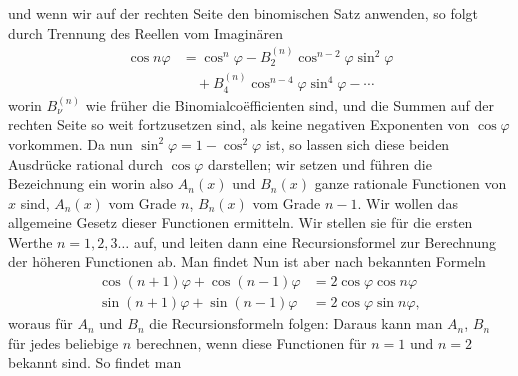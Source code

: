 und wenn wir auf der rechten Seite den binomischen Satz anwenden, so folgt durch Trennung des Reellen vom Imagin\"aren
\[
\begin{aligned}
\cos n\varphi &= \cos^n\varphi - B_2^{(n)}\cos^{n-2}\varphi\sin^2\varphi\\
&\quad + B_4^{(n)}\cos^{n-4}\varphi\sin^4\varphi - \cdots
\end{aligned}
\]
worin $B_\nu^{(n)}$ wie fr\"uher die Binomialco\"efficienten sind, und die Summen auf der rechten Seite so weit fortzusetzen sind, als keine negativen Exponenten von $\cos\varphi$ vorkommen. Da nun $\sin^2\varphi = 1 - \cos^2\varphi$ ist, so lassen sich diese beiden Ausdr\"ucke rational durch $\cos\varphi$ darstellen; wir setzen
und f\"uhren die Bezeichnung ein
worin also $A_n(x)$ und $B_n(x)$ ganze rationale Functionen von $x$ sind, $A_n(x)$ vom Grade $n$, $B_n(x)$ vom Grade $n-1$. Wir wollen das allgemeine Gesetz dieser Functionen ermitteln. Wir stellen sie f\"ur die ersten Werthe $n = 1, 2, 3\ldots$ auf, und leiten dann eine Recursionsformel zur Berechnung der h\"oheren Functionen ab. Man findet
Nun ist aber nach bekannten Formeln
\[
\begin{aligned}
\cos(n+1)\varphi + \cos(n-1)\varphi &= 2\cos\varphi\cos n\varphi\\
\sin(n+1)\varphi + \sin(n-1)\varphi &= 2\cos\varphi\sin n\varphi,
\end{aligned}
\]
woraus f\"ur $A_n$ und $B_n$ die Recursionsformeln folgen:
Daraus kann man $A_n$, $B_n$ f\"ur jedes beliebige $n$ berechnen, wenn diese Functionen f\"ur $n = 1$ und $n = 2$ bekannt sind. So findet man
